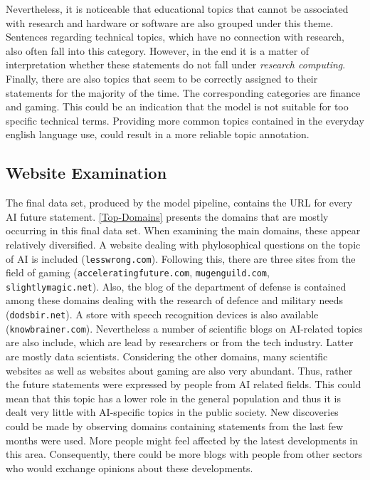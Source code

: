 Nevertheless, it is noticeable that educational topics that cannot be associated with research and hardware or software are also grouped under this theme.
Sentences regarding technical topics, which have no connection with research, also often fall into this category.
However, in the end it is a matter of interpretation whether these statements do not fall under \emph{research computing}.
\\
Finally, there are also topics that seem to be correctly assigned to their statements for the majority of the time.
The corresponding categories are finance and gaming.
This could be an indication that the model is not suitable for too specific technical terms.
Providing more common topics contained in the everyday english language use, could result in a more reliable topic annotation.

\subsection{Website Examination}
The final data set, produced by the model pipeline, contains the URL for every AI future statement.
\autoref{Top-Domains} presents the domains that are mostly occurring in this final data set.
When examining the main domains, these appear relatively  diversified.
A website dealing with phylosophical questions on the topic of AI is included (\texttt{lesswrong.com}).
Following this, there are three sites from the field of gaming (\texttt{acceleratingfuture.com}, \texttt{mugenguild.com}, \texttt{slightlymagic.net}).
Also, the blog of the department of defense is contained among these domains dealing with the research of defence and military needs (\texttt{dodsbir.net}).
A store with speech recognition devices is also available (\texttt{knowbrainer.com}).
Nevertheless a number of scientific blogs on AI-related topics are also include, which are lead by researchers or from the tech industry.
Latter are mostly data scientists.
Considering the other domains, many scientific websites as well as websites about gaming are also very abundant.
Thus, rather the future statements were expressed by people from AI related fields.
This could mean that this topic has a lower role in the general population and thus it is dealt very little with AI-specific topics in the public society.
New discoveries could be made by observing domains containing statements from the last few months were used.
More people might feel affected by the latest developments in this area.
Consequently, there could be more blogs with people from other sectors who would exchange opinions about these developments.
